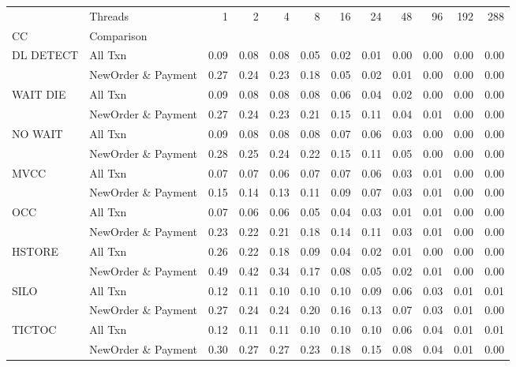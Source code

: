 \begin{tabular}{llrrrrrrrrrr}
\toprule
       & Threads &  1   &  2   &  4   &  8   &  16  &  24  &  48  &  96  &  192 &  288 \\
CC & Comparison &      &      &      &      &      &      &      &      &      &      \\
\midrule
DL DETECT & All Txn & 0.09 & 0.08 & 0.08 & 0.05 & 0.02 & 0.01 & 0.00 & 0.00 & 0.00 & 0.00 \\
       & NewOrder \& Payment & 0.27 & 0.24 & 0.23 & 0.18 & 0.05 & 0.02 & 0.01 & 0.00 & 0.00 & 0.00 \\
WAIT DIE & All Txn & 0.09 & 0.08 & 0.08 & 0.08 & 0.06 & 0.04 & 0.02 & 0.00 & 0.00 & 0.00 \\
       & NewOrder \& Payment & 0.27 & 0.24 & 0.23 & 0.21 & 0.15 & 0.11 & 0.04 & 0.01 & 0.00 & 0.00 \\
NO WAIT & All Txn & 0.09 & 0.08 & 0.08 & 0.08 & 0.07 & 0.06 & 0.03 & 0.00 & 0.00 & 0.00 \\
       & NewOrder \& Payment & 0.28 & 0.25 & 0.24 & 0.22 & 0.15 & 0.11 & 0.05 & 0.00 & 0.00 & 0.00 \\
MVCC & All Txn & 0.07 & 0.07 & 0.06 & 0.07 & 0.07 & 0.06 & 0.03 & 0.01 & 0.00 & 0.00 \\
       & NewOrder \& Payment & 0.15 & 0.14 & 0.13 & 0.11 & 0.09 & 0.07 & 0.03 & 0.01 & 0.00 & 0.00 \\
OCC & All Txn & 0.07 & 0.06 & 0.06 & 0.05 & 0.04 & 0.03 & 0.01 & 0.01 & 0.00 & 0.00 \\
       & NewOrder \& Payment & 0.23 & 0.22 & 0.21 & 0.18 & 0.14 & 0.11 & 0.03 & 0.01 & 0.00 & 0.00 \\
HSTORE & All Txn & 0.26 & 0.22 & 0.18 & 0.09 & 0.04 & 0.02 & 0.01 & 0.00 & 0.00 & 0.00 \\
       & NewOrder \& Payment & 0.49 & 0.42 & 0.34 & 0.17 & 0.08 & 0.05 & 0.02 & 0.01 & 0.00 & 0.00 \\
SILO & All Txn & 0.12 & 0.11 & 0.10 & 0.10 & 0.10 & 0.09 & 0.06 & 0.03 & 0.01 & 0.01 \\
       & NewOrder \& Payment & 0.27 & 0.24 & 0.24 & 0.20 & 0.16 & 0.13 & 0.07 & 0.03 & 0.01 & 0.00 \\
TICTOC & All Txn & 0.12 & 0.11 & 0.11 & 0.10 & 0.10 & 0.10 & 0.06 & 0.04 & 0.01 & 0.01 \\
       & NewOrder \& Payment & 0.30 & 0.27 & 0.27 & 0.23 & 0.18 & 0.15 & 0.08 & 0.04 & 0.01 & 0.00 \\
\bottomrule
\end{tabular}
